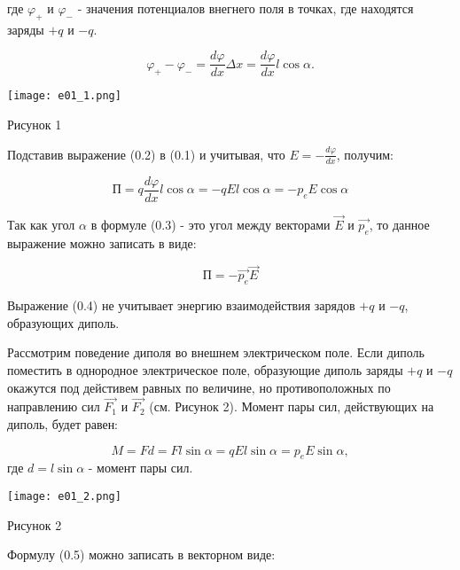 \documentclass[__main__.tex]{subfiles}
\begin{document}
где $\varphi_+$ и $\varphi_-$ - значения потенциалов внегнего поля в точках, где находятся заряды $+q$ и $-q$.

\begin{equation}
\varphi_+ - \varphi_- = \frac{d\varphi}{dx} \Delta x = \frac{d\varphi}{dx} l \cos \alpha.
\end{equation}

\begin{center}
	
	\texttt{[image: e01\_1.png]}
	
	Рисунок 1
	
\end{center}

Подставив выражение (0.2) в (0.1) и учитывая, что $E = -\frac{d\varphi}{dx}$, получим:

\begin{equation}
\textit{П} = q\frac{d\varphi}{dx} l \cos \alpha = -qEl\cos \alpha = -p_e E \cos \alpha
\end{equation}

Так как угол $\alpha$ в формуле (0.3) - это угол между векторами $\vec{E}$ и $\vec{p_e}$, то данное выражение можно записать в виде:

\begin{equation}
\textit{П} = - \vec{p_e} \vec{E}
\end{equation}

Выражение (0.4) не учитывает энергию взаимодействия зарядов $+q$ и $-q$, образующих диполь.

Рассмотрим поведение диполя во внешнем электрическом поле. Если диполь поместить в однородное электрическое поле, образующие диполь заряды $+q$ и $-q$ окажутся под дейстивем равных по величине, но противоположных по направлению сил $\vec{F_1}$ и $\vec{F_2}$ (см. Рисунок 2).
Момент пары сил, действующих на диполь, будет равен:

\begin{equation}
M = Fd = Fl\sin \alpha = qEl\sin \alpha = p_e E \sin \alpha,
\end{equation}
где $d = l\sin \alpha$ - момент пары сил.

\begin{center}
	
	\texttt{[image: e01\_2.png]}
	
	Рисунок 2
	
\end{center}

Формулу (0.5) можно записать в векторном виде:
\end{document}
